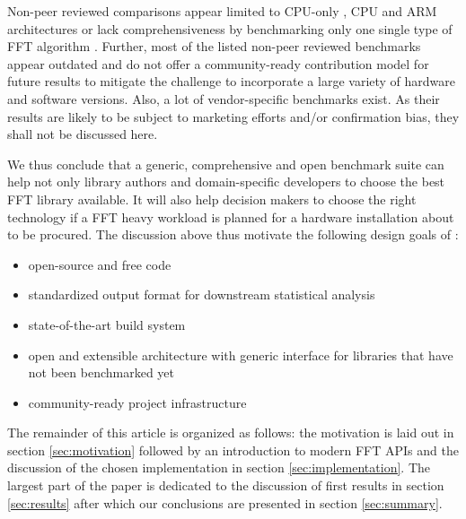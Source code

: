 Non-peer reviewed comparisons appear limited to CPU-only \citep{benchFFT}, CPU and ARM architectures \citep{roy_longbottom} or lack comprehensiveness by benchmarking only one single type of FFT algorithm \citep{fft_check}. Further, most of the listed non-peer reviewed benchmarks appear outdated and do not offer a community-ready contribution model for future results to mitigate the challenge to incorporate a large variety of hardware and software versions. Also, a lot of vendor-specific benchmarks exist. As their results are likely to be subject to marketing efforts and/or confirmation bias, they shall not be discussed here.

We thus conclude that a generic, comprehensive and open benchmark suite can help not only library authors and domain-specific developers to choose the best FFT library available. It will also help decision makers to choose the right technology if a FFT heavy workload is planned for a hardware installation about to be procured. The discussion above thus motivate the following design goals of \gearshifft{}:

\begin{itemize}
\item open-source and free code
\item standardized output format for downstream statistical analysis
\item state-of-the-art build system
\item open and extensible architecture with generic interface for libraries that have not been benchmarked yet
\item community-ready project infrastructure
\end{itemize}

The remainder of this article is organized as follows: the motivation is laid out in section \ref{sec:motivation} followed by an introduction to modern FFT APIs and the discussion of the chosen implementation in section \ref{sec:implementation}. The largest part of the paper is dedicated to the discussion of first results in section \ref{sec:results} after which our conclusions are presented in section \ref{sec:summary}.



%
